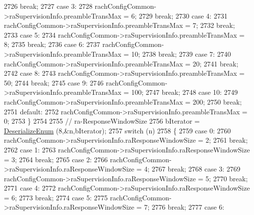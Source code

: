 \begin{DoxyCode}
2726       \textcolor{keywordflow}{break};
2727     \textcolor{keywordflow}{case} 3:
2728       rachConfigCommon->raSupervisionInfo.preambleTransMax = 6;
2729       \textcolor{keywordflow}{break};
2730     \textcolor{keywordflow}{case} 4:
2731       rachConfigCommon->raSupervisionInfo.preambleTransMax = 7;
2732       \textcolor{keywordflow}{break};
2733     \textcolor{keywordflow}{case} 5:
2734       rachConfigCommon->raSupervisionInfo.preambleTransMax = 8;
2735       \textcolor{keywordflow}{break};
2736     \textcolor{keywordflow}{case} 6:
2737       rachConfigCommon->raSupervisionInfo.preambleTransMax = 10;
2738       \textcolor{keywordflow}{break};
2739     \textcolor{keywordflow}{case} 7:
2740       rachConfigCommon->raSupervisionInfo.preambleTransMax = 20;
2741       \textcolor{keywordflow}{break};
2742     \textcolor{keywordflow}{case} 8:
2743       rachConfigCommon->raSupervisionInfo.preambleTransMax = 50;
2744       \textcolor{keywordflow}{break};
2745     \textcolor{keywordflow}{case} 9:
2746       rachConfigCommon->raSupervisionInfo.preambleTransMax = 100;
2747       \textcolor{keywordflow}{break};
2748     \textcolor{keywordflow}{case} 10:
2749       rachConfigCommon->raSupervisionInfo.preambleTransMax = 200;
2750       \textcolor{keywordflow}{break};
2751     \textcolor{keywordflow}{default}:
2752       rachConfigCommon->raSupervisionInfo.preambleTransMax = 0;
2753     \}
2754 
2755   \textcolor{comment}{// ra-ResponseWindowSize}
2756   bIterator = \hyperlink{classns3_1_1Asn1Header_a4fcc253e0eec3483c775b005c1875f2d}{DeserializeEnum} (8,&n,bIterator);
2757   \textcolor{keywordflow}{switch} (n)
2758     \{
2759     \textcolor{keywordflow}{case} 0:
2760       rachConfigCommon->raSupervisionInfo.raResponseWindowSize = 2;
2761       \textcolor{keywordflow}{break};
2762     \textcolor{keywordflow}{case} 1:
2763       rachConfigCommon->raSupervisionInfo.raResponseWindowSize = 3;
2764       \textcolor{keywordflow}{break};
2765     \textcolor{keywordflow}{case} 2:
2766       rachConfigCommon->raSupervisionInfo.raResponseWindowSize = 4;
2767       \textcolor{keywordflow}{break};
2768     \textcolor{keywordflow}{case} 3:
2769       rachConfigCommon->raSupervisionInfo.raResponseWindowSize = 5;
2770       \textcolor{keywordflow}{break};
2771     \textcolor{keywordflow}{case} 4:
2772       rachConfigCommon->raSupervisionInfo.raResponseWindowSize = 6;
2773       \textcolor{keywordflow}{break};
2774     \textcolor{keywordflow}{case} 5:
2775       rachConfigCommon->raSupervisionInfo.raResponseWindowSize = 7;
2776       \textcolor{keywordflow}{break};
2777     \textcolor{keywordflow}{case} 6:

\end{DoxyCode}
